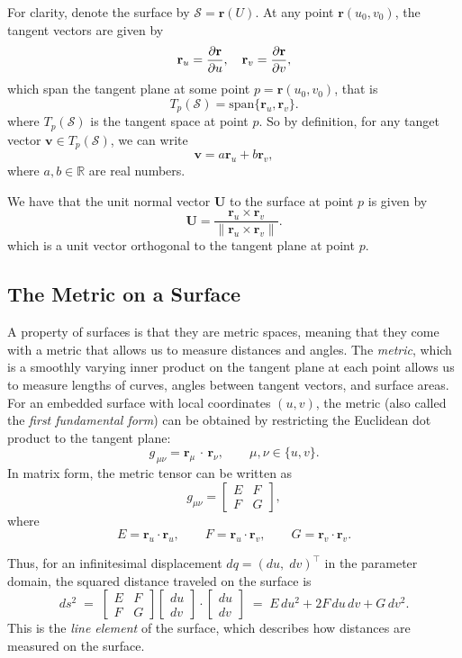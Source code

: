 \documentclass[12pt]{article}
\newcommand{\R}{\mathbb{R}}
\begin{document}
For clarity, denote the surface by $\mathcal{S}=\mathbf{r}(U)$. At any point $\mathbf{r}(u_0,v_0)$, the tangent vectors are given by
\[
\mathbf{r}_u = \pdv{\mathbf{r}}{u}, \quad \mathbf{r}_v = \pdv{\mathbf{r}}{v},
\]
which span the tangent plane at some point $p = \mathbf{r}(u_0,v_0)$, that is 
\[
T_{p}(\mathcal{S}) = \text{span}\{\mathbf{r}_u,\mathbf{r}_v\}.
\]
where $T_{p}(\mathcal{S})$ is the tangent space at point $p$.
So by definition, for any tanget vector $\mathbf{v}\in T_{p}(\mathcal{S})$, we can write
\[
\mathbf{v} = a\mathbf{r}_u + b\mathbf{r}_v,
\]
where $a,b\in\R$ are real numbers.

We have that the unit normal vector $\mathbf{U}$ to the surface at point $p$ is given by
\[
\mathbf{U} = \frac{\mathbf{r}_u\times\mathbf{r}_v}{\|\mathbf{r}_u\times\mathbf{r}_v\|}.
\]
which is a unit vector orthogonal to the tangent plane at point $p$.

\subsection{The Metric on a Surface}
A property of surfaces is that they are metric spaces, meaning that they come with a metric that allows us to measure distances and angles.
The \emph{metric}, which is a smoothly varying inner product on the tangent plane at each point allows us to measure lengths of curves, angles between tangent vectors, and surface areas. 
For an embedded surface with local coordinates $(u,v)$, the metric (also called the \emph{first fundamental form}) can be obtained by restricting the Euclidean dot product to the tangent plane:
\[
g_{\,\mu\nu} = \mathbf{r}_\mu\,\cdot\,\mathbf{r}_\nu, \qquad \mu,\nu \in \{u,v\}.
\]
In matrix form, the metric tensor can be written as 
\[
g_{\mu\nu} = 
\begin{bmatrix}
E & F\\[1ex]
F & G
\end{bmatrix},
\] 
where 
\begin{equation}\label{eq:metric-coefficients}
	E = \mathbf{r}_u\cdot \mathbf{r}_u, \qquad F = \mathbf{r}_u\cdot \mathbf{r}_v, \qquad G = \mathbf{r}_v\cdot \mathbf{r}_v.
\end{equation}

Thus, for an infinitesimal displacement $dq = (du,\;dv)^\top$ in the parameter domain, the squared distance traveled on the surface is 
\begin{equation}\label{eq:line-element}
ds^{2} \;=\; \begin{bmatrix}
	E & F\\[1ex]
	F & G
\end{bmatrix} \begin{bmatrix}
	du\\[1ex]
	dv
\end{bmatrix} \cdot \begin{bmatrix}
	du\\[1ex]
	dv
\end{bmatrix} \;=\; E\,du^{2} + 2F\,du\,dv + G\,dv^{2}.
\end{equation}
This is the \emph{line element} of the surface, which describes how distances are measured on the surface.
\end{document}

